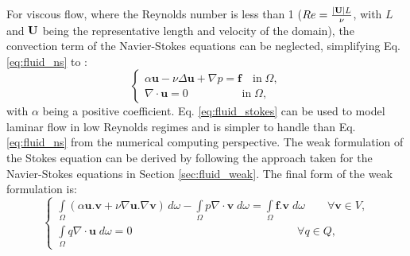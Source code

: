 For viscous flow, where the Reynolds number is less than 1 ($Re = {|{\bf U}|L \over \nu}$, with $L$ and $\bf U$ being the representative length and velocity of the domain), the convection term of the Navier-Stokes equations can be neglected, simplifying Eq. \ref{eq:fluid_ns} to \cite{Quarteroni2014}:
\begin{equation} \label{eq:fluid_stokes}
\left\{ {\begin{array}{*{20}{l}}
\displaystyle  {\alpha \mathbf{u} - \nu\Delta \mathbf{u} + \nabla p = \mathbf{f} \quad \text{in}\;\Omega ,} \\
\displaystyle  {\nabla\cdot\mathbf{u} = 0\quad \quad \quad \quad \;\;\;\text{in}\;\Omega ,}
\end{array}} \right.
\end{equation}
with $\alpha$ being a positive coefficient. Eq. \ref{eq:fluid_stokes} can be used to model laminar flow in low Reynolds regimes and is simpler to handle than Eq. \ref{eq:fluid_ns} from the numerical computing perspective. The weak formulation of the Stokes equation can be derived by following the approach taken for the Navier-Stokes equations in Section \ref{sec:fluid_weak}. The final form of the weak formulation is:
\begin{equation} \label{eq:fluid_stokes_weak}
\left\{ {\begin{array}{*{20}{l}}
\displaystyle  {\int\limits_\Omega  {(\alpha {\mathbf{u}}.{\mathbf{v}} + \nu\nabla {\mathbf{u}}.\nabla {\mathbf{v}})\,} d\omega  - \int\limits_\Omega  {p\nabla\cdot{\mathbf{v}}\;d\omega  = } \int\limits_\Omega  {{\mathbf{f}}.{\mathbf{v}}\;d\omega \qquad {\forall {\mathbf{v}}} \in V,} } \\
\displaystyle  {\int\limits_\Omega  {q\nabla\cdot{\mathbf{u}}\;d\omega  = 0} \qquad \qquad \qquad \qquad \qquad \qquad \qquad \;\;\;{\forall {{q}}} \in Q,}
\end{array}} \right.
\end{equation}

